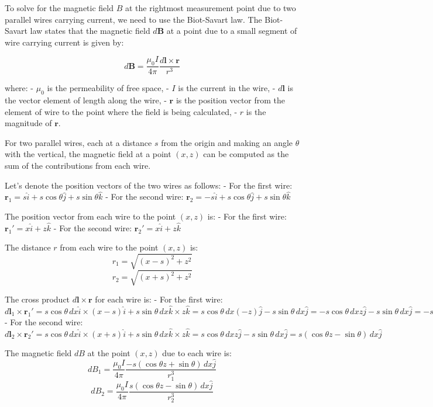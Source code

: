 To solve for the magnetic field \( B \) at the rightmost measurement point due to two parallel wires carrying current, we need to use the Biot-Savart law. The Biot-Savart law states that the magnetic field \( d\mathbf{B} \) at a point due to a small segment of wire carrying current is given by:

\[ d\mathbf{B} = \frac{\mu_0 I}{4\pi} \frac{d\mathbf{l} \times \mathbf{r}}{r^3} \]

where:
- \( \mu_0 \) is the permeability of free space,
- \( I \) is the current in the wire,
- \( d\mathbf{l} \) is the vector element of length along the wire,
- \( \mathbf{r} \) is the position vector from the element of wire to the point where the field is being calculated,
- \( r \) is the magnitude of \( \mathbf{r} \).

For two parallel wires, each at a distance \( s \) from the origin and making an angle \( \theta \) with the vertical, the magnetic field at a point \( (x, z) \) can be computed as the sum of the contributions from each wire.

Let's denote the position vectors of the two wires as follows:
- For the first wire: \( \mathbf{r}_1 = s \hat{i} + s \cos \theta \hat{j} + s \sin \theta \hat{k} \)
- For the second wire: \( \mathbf{r}_2 = -s \hat{i} + s \cos \theta \hat{j} + s \sin \theta \hat{k} \)

The position vector from each wire to the point \( (x, z) \) is:
- For the first wire: \( \mathbf{r}_1' = x \hat{i} + z \hat{k} \)
- For the second wire: \( \mathbf{r}_2' = x \hat{i} + z \hat{k} \)

The distance \( r \) from each wire to the point \( (x, z) \) is:
\[ r_1 = \sqrt{(x - s)^2 + z^2} \]
\[ r_2 = \sqrt{(x + s)^2 + z^2} \]

The cross product \( d\mathbf{l} \times \mathbf{r} \) for each wire is:
- For the first wire: \( d\mathbf{l}_1 \times \mathbf{r}_1' = s \cos \theta \, dx \hat{i} \times (x - s) \hat{i} + s \sin \theta \, dx \hat{k} \times z \hat{k} = s \cos \theta \, dx (-z) \hat{j} - s \sin \theta \, dx \hat{j} = -s \cos \theta \, dx z \hat{j} - s \sin \theta \, dx \hat{j} = -s (\cos \theta z + \sin \theta) \, dx \hat{j} \)
- For the second wire: \( d\mathbf{l}_2 \times \mathbf{r}_2' = s \cos \theta \, dx \hat{i} \times (x + s) \hat{i} + s \sin \theta \, dx \hat{k} \times z \hat{k} = s \cos \theta \, dx z \hat{j} - s \sin \theta \, dx \hat{j} = s (\cos \theta z - \sin \theta) \, dx \hat{j} \)

The magnetic field \( dB \) at the point \( (x, z) \) due to each wire is:
\[ dB_1 = \frac{\mu_0 I}{4\pi} \frac{-s (\cos \theta z + \sin \theta) \, dx \hat{j}}{r_1^3} \]
\[ dB_2 = \frac{\mu_0 I}{4\pi} \frac{s (\cos \theta z - \sin \theta) \, dx \hat{j}}{r_2^3} \]

